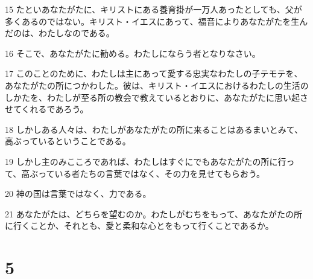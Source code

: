 \par 15 たといあなたがたに、キリストにある養育掛が一万人あったとしても、父が多くあるのではない。キリスト・イエスにあって、福音によりあなたがたを生んだのは、わたしなのである。
\par 16 そこで、あなたがたに勧める。わたしにならう者となりなさい。
\par 17 このことのために、わたしは主にあって愛する忠実なわたしの子テモテを、あなたがたの所につかわした。彼は、キリスト・イエスにおけるわたしの生活のしかたを、わたしが至る所の教会で教えているとおりに、あなたがたに思い起させてくれるであろう。
\par 18 しかしある人々は、わたしがあなたがたの所に来ることはあるまいとみて、高ぶっているということである。
\par 19 しかし主のみこころであれば、わたしはすぐにでもあなたがたの所に行って、高ぶっている者たちの言葉ではなく、その力を見せてもらおう。
\par 20 神の国は言葉ではなく、力である。
\par 21 あなたがたは、どちらを望むのか。わたしがむちをもって、あなたがたの所に行くことか、それとも、愛と柔和な心とをもって行くことであるか。

\chapter{5}


